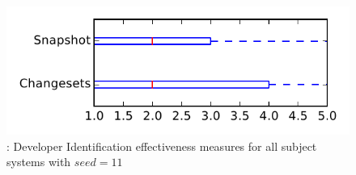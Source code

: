 
\begin{figure}
\centering
\includegraphics[height=0.4\textheight]{figures/dit_seed/rq1_tiny_11}
\caption{\rtwo: Developer Identification effectiveness measures for all subject systems with $seed=11$}
\label{fig:dit_seed:rq1:tiny}
\end{figure}

